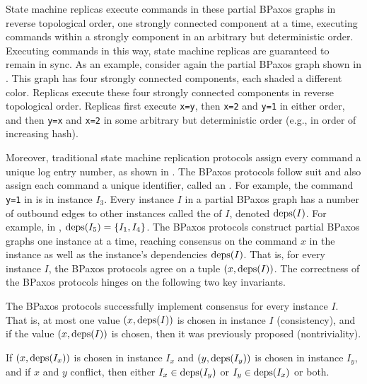 State machine replicas execute commands in these partial BPaxos graphs in
reverse topological order, one strongly connected component at a time, executing
commands within a strongly component in an arbitrary but deterministic order.
Executing commands in this way, state machine replicas are guaranteed to remain
in sync. As an example, consider again the partial BPaxos graph shown in
. This graph has four strongly connected components, each
shaded a different color. Replicas execute these four strongly connected
components in reverse topological order. Replicas first execute \texttt{x=y},
then \texttt{x=2} and \texttt{y=1} in either order, and then \texttt{y=x} and
\texttt{x=2} in some arbitrary but deterministic order (e.g., in order of
increasing hash).

Moreover, traditional state machine replication protocols assign every command
a unique log entry number, as shown in . The BPaxos protocols
follow suit and also assign each command a unique identifier, called an
. For example, the command \texttt{y=1} in 
is in instance $I_3$. Every instance $I$ in a partial BPaxos graph has a number
of outbound edges to other instances called the  of $I$,
denoted $\text{deps}(I)$. For example, in , $\text{deps}(I_5) = \{I_1,
I_4\}$.
%
The BPaxos protocols construct partial BPaxos graphs one instance at a time,
reaching consensus on the command $x$ in the instance as well as the instance's
dependencies $\text{deps}(I)$. That is, for every instance $I$, the BPaxos protocols
agree on a tuple $(x, \text{deps}(I))$.
%
The correctness of the BPaxos protocols hinges on the following two key
invariants.

\begin{invariant}
  The BPaxos protocols successfully implement consensus for every instance $I$.
  That is, at most one value $(x, \text{deps}(I))$ is chosen in instance $I$
  (consistency), and if the value $(x, \text{deps}(I))$ is chosen, then it was
  previously proposed (nontriviality).
\end{invariant}%
%
\begin{invariant}
  If $(x, \text{deps}(I_x))$ is chosen in instance $I_x$ and $(y, \text{deps}(I_y))$ is
  chosen in instance $I_y$, and if $x$ and $y$ conflict, then either $I_x \in
  \text{deps}(I_y)$ or $I_y \in \text{deps}(I_x)$ or both.
\end{invariant}

